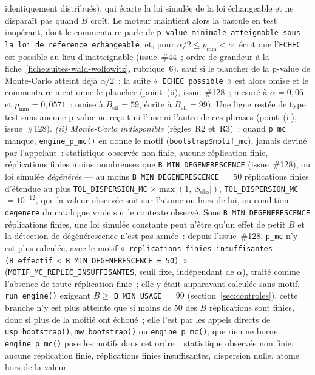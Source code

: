 \documentclass[a4paper,11pt]{article}
\newcommand{\code}[1]{\texttt{\small #1}}
\begin{document}
identiquement distribués), qui écarte la loi simulée de la loi échangeable et ne disparaît pas
quand $B$ croît. Le moteur maintient alors la bascule en test inopérant, dont le
commentaire parle de \code{p-value minimale atteignable sous la loi de reference echangeable}, et,
pour $\alpha/2 \le p_{\min} < \alpha$, écrit que l'\code{ECHEC} est possible au lieu
d'inatteignable (issue~\#44~; ordre de grandeur à la fiche~\ref{fiche:suites-wald-wolfowitz},
rubrique~6), sauf si le plancher de la p-value de Monte-Carlo atteint déjà $\alpha/2$~: la
suite «~\code{ECHEC possible}~» est alors omise et le commentaire mentionne le plancher
(point~(ii), issue~\#128~; mesuré à $\alpha = 0{,}06$ et $p_{\min} = 0{,}0571$~: omise à
$B_{\text{eff}} = 59$, écrite à $B_{\text{eff}} = 99$). Une ligne restée de type test sans
aucune p-value ne reçoit ni l'une ni l'autre de ces phrases (point~(ii), issue~\#128).
\emph{(ii) Monte-Carlo indisponible} (règles~R2 et~R3)~: quand \code{p\_mc} manque,
\code{engine\_p\_mc()} en donne le motif (\code{bootstrap\$motif\_mc}), jamais deviné par
l'appelant~: statistique observée non finie, aucune réplication finie, réplications finies
moins nombreuses que \code{B\_MIN\_DEGENERESCENCE} (issue~\#128), ou loi simulée
\emph{dégénérée} --- au moins \code{B\_MIN\_DEGENERESCENCE} $= 50$ réplications finies
d'étendue au plus \code{TOL\_DISPERSION\_MC} $\times \max(1, |S_{\text{obs}}|)$,
\code{TOL\_DISPERSION\_MC} $= 10^{-12}$, que la valeur observée soit sur l'atome ou hors de lui,
ou condition \code{degenere} du catalogue vraie sur le contexte observé. Sous
\code{B\_MIN\_DEGENERESCENCE} réplications finies, une loi simulée constante peut n'être qu'un
effet de petit $B$ et la détection de dégénérescence n'est pas armée~: depuis l'issue~\#128,
\code{p\_mc} n'y est plus calculée, avec le motif «~\code{replications finies insuffisantes
(B\_effectif < B\_MIN\_DEGENERESCENCE = 50)}~» (\code{MOTIF\_MC\_REPLIC\_INSUFFISANTES}, seuil
fixe, indépendant de $\alpha$), traité comme l'absence de toute réplication finie~; elle y était
auparavant calculée sans motif. \code{run\_engine()} exigeant
$B \ge$ \code{B\_MIN\_USAGE} $= 99$ (section~\ref{sec:controles}), cette branche n'y est plus
atteinte que si moins de 50 des $B$ réplications sont finies, donc si plus de la moitié ont
échoué~; elle l'est par les appels directs de
\code{usp\_bootstrap()}, \code{mw\_bootstrap()} ou \code{engine\_p\_mc()}, que rien ne borne.
\code{engine\_p\_mc()} pose les motifs dans cet ordre~: statistique observée non finie, aucune
réplication finie, réplications finies insuffisantes, dispersion nulle, atome hors de la valeur
\end{document}
